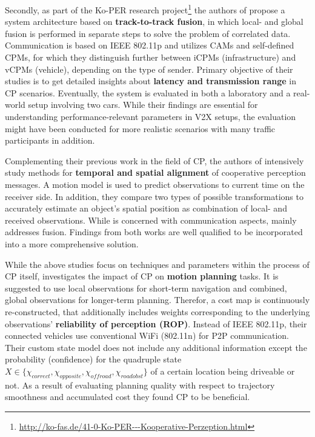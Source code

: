 Secondly, as part of the Ko-PER research project\footnote{\url{http://ko-fas.de/41-0-Ko-PER---Kooperative-Perzeption.html}} the authors of \cite{Rauch2011} propose a system architecture based on \textbf{track-to-track fusion}, in which local- and global fusion is performed in separate steps to solve the problem of correlated data. Communication is based on IEEE 802.11p and utilizes CAMs and self-defined CPMs, for which they distinguish further between iCPMs (infrastructure) and vCPMs (vehicle), depending on the type of sender. Primary objective of their studies is to get detailed insights about \textbf{latency and transmission range} in CP scenarios. Eventually, the system is evaluated in both a laboratory and a real-world setup involving two cars. While their findings are essential for understanding performance-relevant parameters in V2X setups, the evaluation might have been conducted for more realistic scenarios with many traffic participants in addition.

Complementing their previous work in the field of CP, the authors of \cite{Rauch2012} intensively study methods for \textbf{temporal and spatial alignment} of cooperative perception messages. A motion model is used to predict observations to current time on the receiver side. In addition, they compare two types of possible transformations to accurately estimate an object's spatial position as combination of local- and received observations. While \cite{Rauch2011} is concerned with communication aspects, \cite{Rauch2012} mainly addresses fusion. Findings from both works are well qualified to be incorporated into a more comprehensive solution. 
\par
\bigskip

While the above studies focus on techniques and parameters within the process of CP itself, \cite{liu2013motion} investigates the impact of CP on \textbf{motion planning} tasks. It is suggested to use local observations for short-term navigation and combined, global observations for longer-term planning. Therefor, a cost map is continuously re-constructed, that additionally includes weights corresponding to the underlying observations' \textbf{reliability of perception (ROP)}. Instead of IEEE 802.11p, their connected vehicles use conventional WiFi (802.11n) for P2P communication. Their custom state model does not include any additional information except the probability (confidence) for the quadruple state $X \in \{\chi_{correct}, \chi_{opposite}, \chi_{offroad}, \chi_{roadobst}\}$ of a certain location being driveable or not. As a result of evaluating planning quality with respect to trajectory smoothness and accumulated cost they found CP to be beneficial.

